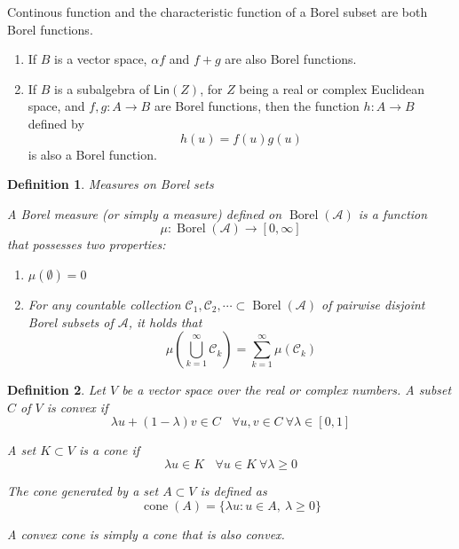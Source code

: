 \documentclass[aps,pra,onecolumn,notitlepage,superscriptaddress]{revtex4-1}
\newcommand{\spc}[1]{\mathcal{#1}}
\newcommand{\Lin}{\mathsf{Lin}}
\newcommand{\op}[1]{\operatorname{#1}}
\newtheorem{defi}{Definition}
\begin{document}
    Continous function and the characteristic function of a Borel subset are both Borel functions.

    \begin{enumerate}
        \item If $B$ is a vector space, $\alpha f$ and $f+g$ are also Borel functions.
        \item If $B$ is a subalgebra of $\Lin(Z)$, for $Z$ being a real or complex Euclidean space, and $f,g : A \to B$ are Borel functions, then the function $h : A \to B$ defined by
        \begin{equation*}
            h(u) = f(u)g(u)
        \end{equation*}
        is also a Borel function.
    \end{enumerate}

    \begin{defi}
        Measures on Borel sets

        A Borel measure (or simply a measure) defined on $\op{Borel}(\spc A)$ is a function
        \begin{equation}
            \mu : \op{Borel}(\spc A) \to [0, \infty]
        \end{equation}
        that possesses two properties:
        \begin{enumerate}
            \item $\mu(\emptyset) = 0$
            \item  For any countable collection ${\spc C_1 ,\spc C_2 ,\cdots} \subset \op{Borel}(\spc A)$ of pairwise disjoint Borel subsets of $\spc A$, it holds that
            \begin{equation}
                \mu(\bigcup_{k=1}^{\infty} \spc C_k) = \sum_{k=1}^{\infty} \mu(\spc C_k)
            \end{equation}
        \end{enumerate}
    \end{defi}

    \begin{defi}
        Let $V$ be a vector space over the real or complex numbers. A subset $C$ of $V$ is convex if
        \begin{equation}
            \lambda u + (1 - \lambda) v \in C \ \ \ \ \forall u,v \in C \ \forall \lambda \in [0,1]
        \end{equation}

        A set $K \subset V$ is a cone if
        \begin{equation}
            \lambda u \in K \ \ \ \ \forall u \in K \ \forall \lambda \geq 0
        \end{equation}

        The cone generated by a set $A \subset V$ is defined as
        \begin{equation}
            \op{cone}(A) = \{ \lambda u : u \in A, \ \lambda \geq 0 \}
        \end{equation}

        A convex cone is simply a cone that is also convex. 
    \end{defi}
\end{document}
